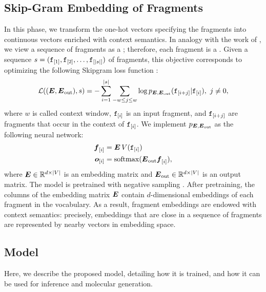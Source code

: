 \subsection{Skip-Gram Embedding of Fragments}
In this phase, we transform the one-hot vectors specifying the fragments into continuous vectors enriched with context semantics. In analogy with the work of \citet{bowman2016sentencescontinuousspace}, we view a sequence of fragments as a ; therefore, each fragment is a . Given a sequence $s = (\mathtt{f}_{[1]}, \mathtt{f}_{[2]}, \ldots, \mathtt{f}_{[|s|]})$ of fragments, this objective corresponds to optimizing the following Skipgram loss function \citep{mikolov2014skipgram}:
$$\Loss((\Matrix{E}, \Matrix{E}_{\mathrm{out}}), s) = - \sum_{i=1}^{|s|}\sum_{-w \leq j \leq w} \log p_{\Matrix{E}, \Matrix{E}_{\mathrm{out}}}(\Graph{f}_{[i+j]}| \Graph{f}_{[i]}),\ j \neq 0,$$
where $w$ is called context window, $\mathtt{f}_{[i]}$ is an input fragment, and $\mathtt{f}_{[i+j]}$ are fragments that occur in the context of $\mathtt{f}_{[i]}$. We implement $p_{\Matrix{E}, \Matrix{E}_{\mathrm{out}}}$ as the following neural network:
\begin{align*}
    \Elem{f}{i} &= \Matrix{E}\, V(\Graph{f}_{[i]})\\
    \Elem{o}{i} &= \softmax(\Matrix{E}_{\mathrm{out}}\Elem{f}{i}),
\end{align*}
where $\Matrix{E} \in \Real^{d \times |V|}$ is an embedding matrix and $\Matrix{E}_{\mathrm{out}} \in \Real^{d \times |V|}$ is an output matrix. The model is pretrained with negative sampling \citep{mikolov2014skipgram}. After pretraining, the columns of the embedding matrix $\Matrix{E}$ contain $d$-dimensional embeddings of each fragment in the vocabulary. As a result, fragment embeddings are endowed with context semantics: precisely, embeddings that are close in a sequence of fragments are represented by nearby vectors in embedding space.

\subsection{Model}
Here, we describe the proposed model, detailing how it is trained, and how it can be used for inference and molecular generation.


